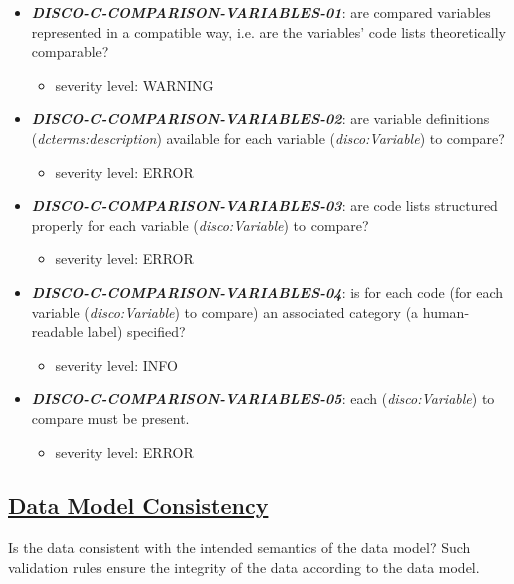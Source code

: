 \documentclass{llncs}
\begin{document}
\begin{itemize}
	\item \textbf{{\em DISCO-C-COMPARISON-VARIABLES-01}}: 
	are compared variables represented in a compatible way, i.e. are the variables' code lists theoretically comparable?
		\begin{itemize}
		\item severity level: WARNING
	\end{itemize}
	\item \textbf{{\em DISCO-C-COMPARISON-VARIABLES-02}}: 
	are variable definitions (\emph{dcterms:description}) available for each variable (\emph{disco:Variable}) to compare?
		\begin{itemize}
		\item severity level: ERROR
	\end{itemize}
	\item \textbf{{\em DISCO-C-COMPARISON-VARIABLES-03}}:
	are code lists structured properly for each variable (\emph{disco:Variable}) to compare?
		\begin{itemize}
		\item severity level: ERROR
	\end{itemize}
	\item \textbf{{\em DISCO-C-COMPARISON-VARIABLES-04}}:
	is for each code (for each variable (\emph{disco:Variable}) to compare) an associated category (a human-readable label) specified?
		\begin{itemize}
		\item severity level: INFO
	\end{itemize}
	\item \textbf{{\em DISCO-C-COMPARISON-VARIABLES-05}}:
	each (\emph{disco:Variable}) to compare must be present.
	\begin{itemize}
		\item severity level: ERROR
	\end{itemize}
\end{itemize}

\subsection{\underline{Data Model Consistency}}
Is the data consistent with the intended semantics of the data model?
Such validation rules ensure the integrity of the data according to the data model.
\end{document}
